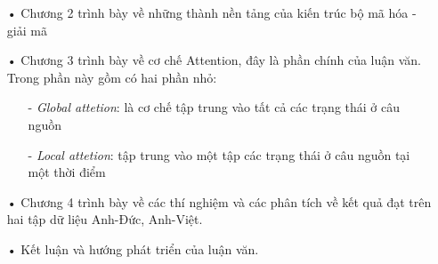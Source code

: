 \begin{itemize}
	\item[•] Chương 2 trình bày về những thành nền tảng của kiến trúc bộ mã hóa - giải mã
	
	\item[•] Chương 3 trình bày về cơ chế Attention, đây là phần chính của luận văn. Trong phần này gồm có hai phần nhỏ:
		\begin{itemize}
			\item[-] \textit{Global attetion}: là cơ chế tập trung vào tất cả các trạng thái ở câu nguồn
			\item[-] \textit{Local attetion}: tập trung vào một tập các trạng thái ở câu nguồn tại một thời điểm
		\end{itemize}
	\item[•] Chương 4 trình bày về các thí nghiệm và các phân tích về kết quả đạt trên hai tập dữ liệu Anh-Đức, Anh-Việt.
	\item[•] Kết luận và hướng phát triển của luận văn.
\end{itemize}






